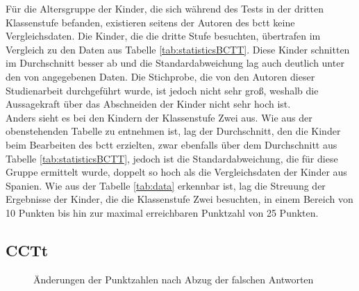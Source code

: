 	Für die Altersgruppe der Kinder, die sich während des Tests in der dritten Klassenstufe befanden, existieren seitens der Autoren des \acrshort{bctt} keine Vergleichsdaten. Die Kinder, die die dritte Stufe besuchten, übertrafen im Vergleich zu den Daten aus Tabelle \ref{tab:statisticsBCTT}. Diese Kinder schnitten im Durchschnitt besser ab und die Standardabweichung lag auch deutlich unter den von \citeauthor{bcct} angegebenen Daten. Die Stichprobe, die von den Autoren dieser Studienarbeit durchgeführt wurde, ist jedoch nicht sehr groß, weshalb die Aussagekraft über das Abschneiden der Kinder nicht sehr hoch ist.\\
	Anders sieht es bei den Kindern der Klassenstufe Zwei aus. Wie aus der obenstehenden Tabelle zu entnehmen ist, lag der Durchschnitt, den die Kinder beim Bearbeiten des \acrlong{bctt} erzielten, zwar ebenfalls über dem Durchschnitt aus Tabelle \ref{tab:statisticsBCTT}, jedoch ist die Standardabweichung, die für diese Gruppe ermittelt wurde, doppelt so hoch als die Vergleichsdaten der Kinder aus Spanien. Wie aus der Tabelle \ref{tab:data} erkennbar ist, lag die Streuung der Ergebnisse der Kinder, die die Klassenstufe Zwei besuchten, in einem Bereich von 10 Punkten bis hin zur maximal erreichbaren Punktzahl von 25 Punkten.   
	\subsection{CCTt}
	\mydata

	\begin{figure}[H]
		\caption[Änderungen Punktzahlen nach Abzug]{Änderungen der Punktzahlen nach Abzug der falschen Antworten}
		\label{img:wrongAnswerCorrection}
	\end{figure}



	

